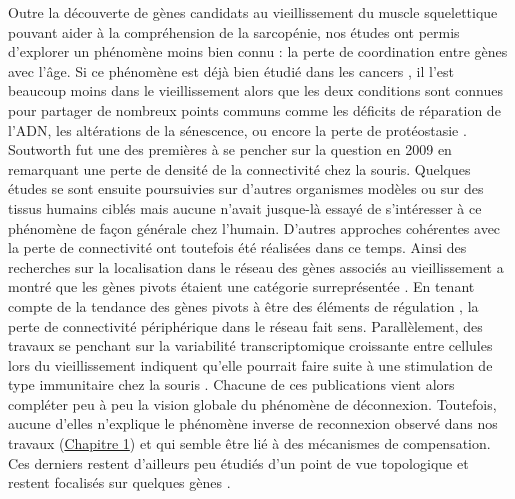 Outre la découverte de gènes candidats au vieillissement du muscle squelettique pouvant aider à la compréhension de la sarcopénie, nos études ont permis d'explorer un phénomène moins bien connu : la perte de coordination entre gènes avec l'âge. Si ce phénomène est déjà bien étudié dans les cancers \cite{Anglani2014}, il l'est beaucoup moins dans le vieillissement alors que les deux conditions sont connues pour partager de nombreux points communs comme les déficits de réparation de l'ADN, les altérations de la sénescence, ou encore la perte de protéostasie \cite{Hanahan2000Jan}. Soutworth fut une des premières à se pencher sur la question en 2009 \cite{Southworth2009} en remarquant une perte de densité de la connectivité chez la souris. Quelques études se sont ensuite poursuivies sur d'autres organismes modèles \cite{Woo2016May} ou sur des tissus humains ciblés \cite{Bormann2016,Derous2016May} mais aucune n'avait jusque-là essayé de s'intéresser à ce phénomène de façon générale chez l'humain. D'autres approches cohérentes avec la perte de connectivité ont toutefois été réalisées dans ce temps. Ainsi des recherches sur la localisation dans le réseau des gènes associés au vieillissement a montré que les gènes pivots étaient une catégorie surreprésentée \cite{Zhang2016Jul}. En tenant compte de la tendance des gènes pivots à être des éléments de régulation \cite{Jeong2001May}, la perte de connectivité périphérique dans le réseau fait sens. Parallèlement, des travaux se penchant sur la variabilité transcriptomique croissante entre cellules lors du vieillissement indiquent qu'elle pourrait faire suite à une stimulation de type immunitaire chez la souris \cite{Martinez-Jimenez2017Mar}. Chacune de ces publications vient alors compléter peu à peu la vision globale du phénomène de déconnexion. Toutefois, aucune d'elles n'explique le phénomène inverse de reconnexion observé dans nos travaux (\hyperref[chapter:gwena]{Chapitre 1}) et qui semble être lié à des mécanismes de compensation. Ces derniers restent d'ailleurs peu étudiés d'un point de vue topologique et restent focalisés sur quelques gènes \cite{Scheller2018}.




